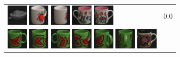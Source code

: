 \begin{figure}[tbp]
\begin{center}
\begin{tabular}{m{11cm} | m{3cm} |}
\includegraphics[width=1cm]{coil/beeld-29.eps} 
\includegraphics[width=1cm]{coil/beeld-39.eps} 
\includegraphics[width=1cm]{coil/beeld-38.eps} 
\includegraphics[width=1cm]{coil/beeld-7.eps} 
\includegraphics[width=1cm]{coil/beeld-6.eps} & {\scriptsize 0.0} \\ 
\includegraphics[width=1cm]{coil/beeld-30.eps} 
\includegraphics[width=1cm]{coil/beeld-32.eps} 
\includegraphics[width=1cm]{coil/beeld-31.eps} 
\includegraphics[width=1cm]{coil/beeld-33.eps} 
\includegraphics[width=1cm]{coil/beeld-34.eps} 
\includegraphics[width=1cm]{coil/beeld-35.eps} 
\includegraphics[width=1cm]{coil/beeld-60.eps} 

\end{tabular}
\end{center}
\end{figure}
